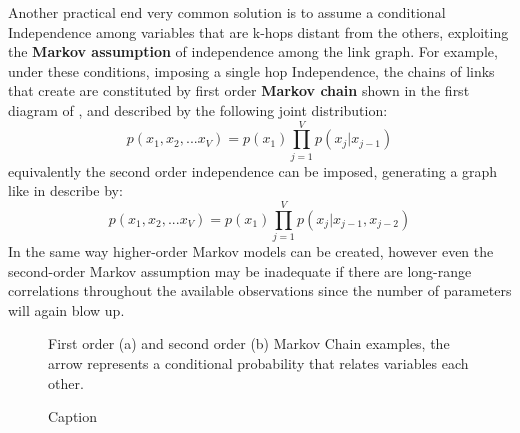 Another practical end very common solution is to assume a conditional Independence among variables that are k-hops distant from the others, exploiting the \textbf{Markov assumption} of independence among the link graph.
For example, under these conditions, imposing a single hop Independence, the chains of links that create are constituted by first order \textbf{Markov chain} shown in the first diagram of \Figure{\ref{fig:simple_markov_chains_a}}, and described by the following joint distribution:
\begin{equation}
    p(x_1, x_2, ... x_V) = p(x_1) \prod_{j=1}^V p(x_j|x_{j-1})
\end{equation}
equivalently the second order independence can be imposed, generating a graph like in \Figure{\ref{fig:simple_markov_chains_b}} describe by:
\begin{equation}
    p(x_1, x_2, ... x_V) = p(x_1) \prod_{j=1}^V p(x_j|x_{j-1},x_{j-2})
\end{equation}
In the same way higher-order Markov models can be created, however even the second-order Markov assumption may be inadequate if there are long-range correlations throughout the available observations since the number of parameters will again blow up. 


\begin{figure}
    \centering
    \caption{First order (a) and second order (b) Markov Chain examples, the arrow represents a conditional probability that relates variables each other.}
    \label{fig:simple_markov_chains}
\end{figure}

\begin{figure}
    \centering
    \caption{Caption}
\end{figure}

